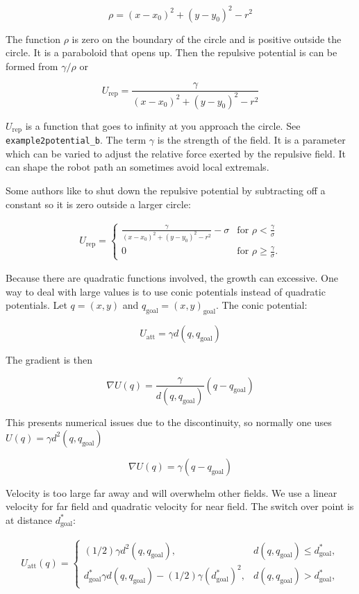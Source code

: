 \[\rho = (x-x_0)^2 + (y-y_0)^2 - r^2\]

The function \(\rho\) is zero on the boundary of the circle and is
positive outside the circle. It is a paraboloid that opens up. Then the
repulsive potential is can be formed from \(\gamma/\rho\) or

\[U_\text{rep} = \frac{\gamma}{(x-x_0)^2 + (y-y_0)^2 - r^2}\]

\(U_\text{rep}\) is a function that goes to infinity at you approach the
circle. See \texttt{example2potential\_b}. The term \(\gamma\) is the
strength of the field. It is a parameter which can be varied to adjust
the relative force exerted by the repulsive field. It can shape the
robot path an sometimes avoid local extremals.

Some authors like to shut down the repulsive potential by subtracting
off a constant so it is zero outside a larger circle:

\[\begin{aligned}
U_\text{rep} = \left\{
\begin{array}{ll}
\displaystyle \frac{\gamma}{(x-x_0)^2 + (y-y_0)^2 - r^2} - \sigma & \text{for  } \rho < \frac{\gamma}{\sigma}\\[3mm]
0 &  \text{for  } \rho \geq \frac{\gamma}{\sigma}.
\end{array} \right.
\end{aligned}\]

Because there are quadratic functions involved, the growth can
excessive. One way to deal with large values is to use conic potentials
instead of quadratic potentials. Let \(q=(x,y)\) and
\(q_\text{goal} = (x,y)_\text{goal}\). The conic potential:

\[U_\text{att} = \gamma d(q, q_\text{goal})\]

The gradient is then

\[\nabla U(q) = \frac{\gamma}{d(q, q_\text{goal})} (q-q_\text{goal})\]

This presents numerical issues due to the discontinuity, so normally one
uses \(U(q) = \gamma d^2(q, q_\text{goal})\)

\[\nabla U(q) = \gamma (q-q_\text{goal})\]

Velocity is too large far away and will overwhelm other fields. We use a
linear velocity for far field and quadratic velocity for near field. The
switch over point is at distance \(d^*_\text{goal}\):

\[\begin{aligned}
U_\text{att}(q) = \left\{ \begin{array}{ll} (1/2)\gamma d^2(q, q_\text{goal}), & d(q, q_\text{goal})\leq d^*_\text{goal},\\[3mm]
d^*_\text{goal}\gamma d(q, q_\text{goal}) - (1/2)\gamma (d^*_\text{goal})^2, & d(q, q_\text{goal})> d^*_\text{goal},
\end{array}\right.
\end{aligned}\]

